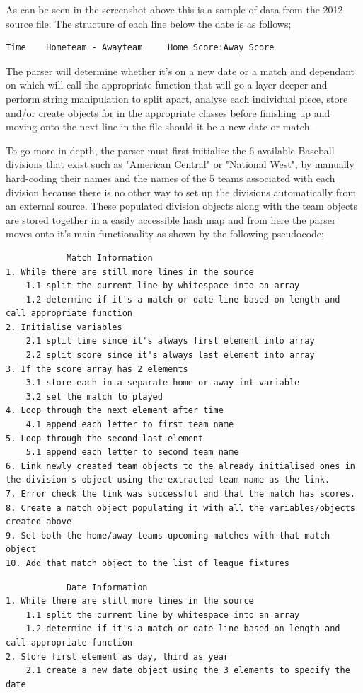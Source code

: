 As can be seen in the screenshot above this is a sample of data from the 2012 source file. The structure of each line below the date is as follows;
 
\begin{verbatim}
Time 	Hometeam - Awayteam 	Home Score:Away Score
\end{verbatim}

The parser will determine whether it's on a new date or a match and dependant on which will call the appropriate function that will go a layer deeper and perform string manipulation to split apart, analyse each individual piece, store and/or create objects for in the appropriate classes before finishing up and moving onto the next line in the file should it be a new date or match.

To go more in-depth, the parser must first initialise the 6 available Baseball divisions that exist such as "American Central" or "National West", by manually hard-coding their names and the names of the 5 teams associated with each division because there is no other way to set up the divisions automatically from an external source. These populated division objects along with the team objects are stored together in a easily accessible hash map and from here the parser moves onto it's main functionality as shown by the following pseudocode;

\begin{verbatim}
			Match Information
1. While there are still more lines in the source
	1.1 split the current line by whitespace into an array 
	1.2 determine if it's a match or date line based on length and call appropriate function
2. Initialise variables
	2.1 split time since it's always first element into array
	2.2 split score since it's always last element into array
3. If the score array has 2 elements
	3.1 store each in a separate home or away int variable
	3.2 set the match to played
4. Loop through the next element after time
	4.1 append each letter to first team name
5. Loop through the second last element
	5.1 append each letter to second team name
6. Link newly created team objects to the already initialised ones in the division's object using the extracted team name as the link.
7. Error check the link was successful and that the match has scores.
8. Create a match object populating it with all the variables/objects created above
9. Set both the home/away teams upcoming matches with that match object
10. Add that match object to the list of league fixtures
\end{verbatim}

\begin{verbatim}
			Date Information
1. While there are still more lines in the source
	1.1 split the current line by whitespace into an array 
	1.2 determine if it's a match or date line based on length and call appropriate function
2. Store first element as day, third as year
	2.1 create a new date object using the 3 elements to specify the date
\end{verbatim}
